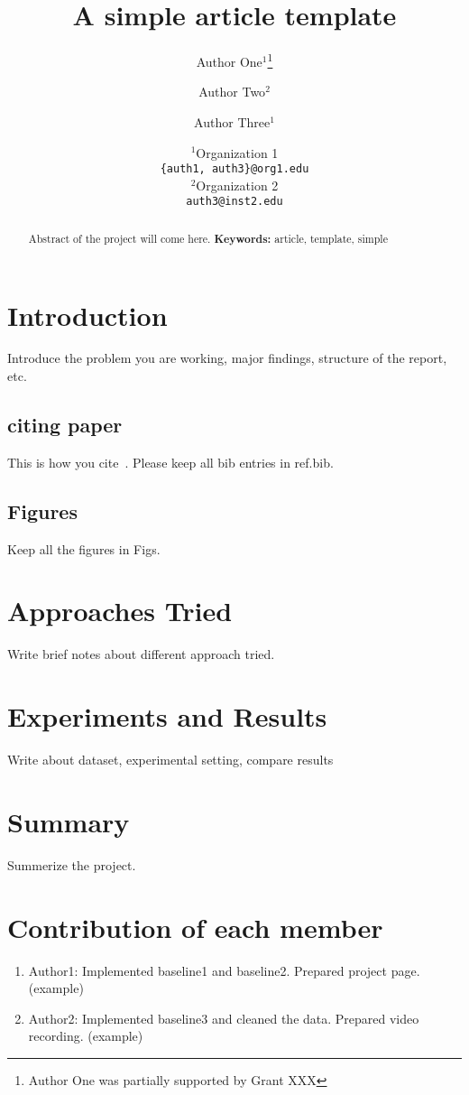 \documentclass[a4paper]{article}
\title{A simple article template}
\author{Author One$^1$\thanks{Author One was partially supported by Grant XXX} \and Author Two$^2$ \and Author Three$^1$}
\date{
	$^1$Organization 1 \\ \texttt{\{auth1, auth3\}@org1.edu}\\%
	$^2$Organization 2 \\ \texttt{auth3@inst2.edu}\\[2ex]%
}
\theoremstyle{plain}
\theoremstyle{definition}
\begin{document}
	\maketitle
	
	\begin{abstract}
		Abstract of the project will come here.	
		\vspace{10cm}	
		\noindent\textbf{Keywords:} article, template, simple
	\end{abstract}

	\tableofcontents
	
	\section{Introduction}
	\label{sec:intro}
	Introduce the problem you are working, major findings, structure of the report, etc.
	
	\subsection{citing paper}
	This is how you cite~\cite{cstbir2024aaai}. Please keep all bib entries in ref.bib.
	\subsection{Figures}
	Keep all the figures in Figs.
	\newpage
	
	
	\section{Approaches Tried}
	\label{sec:app}
	Write brief notes about different approach tried.
	\newpage

	
	\section{Experiments and Results}
	\label{sec:app}
	Write about dataset, experimental setting, compare results
	
	
	
	
	\section{Summary}
	\label{sec:app}
	Summerize the project.
	

	
	
	
	\appendix
	
	\section{Contribution of each member}
	\label{sec:contribution}
	\begin{enumerate}
	\item Author1: Implemented baseline1 and baseline2. Prepared project page.(example)
	\item Author2: Implemented baseline3 and cleaned the data. Prepared video recording. (example)
	
	\end{enumerate}
    	
	
\end{document}
